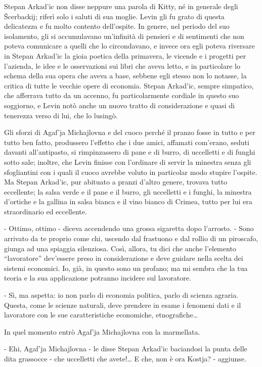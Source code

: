 Stepan Arkad'ic non disse neppure una parola di Kitty, né in generale degli Šcerbackij; riferì solo i saluti di sua moglie. Levin gli fu grato di questa delicatezza e fu molto contento dell'ospite. In genere, nel periodo del suo isolamento, gli si accumulavano un'infinità di pensieri e di sentimenti che non poteva comunicare a quelli che lo circondavano, e invece ora egli poteva riversare in Stepan Arkad'ic la gioia poetica della primavera, le vicende e i progetti per l'azienda, le idee e le osservazioni sui libri che aveva letto, e in particolare lo schema della sua opera che aveva a base, sebbene egli stesso non lo notasse, la critica di tutte le vecchie opere di economia. Stepan Arkad'ic, sempre simpatico, che afferrava tutto da un accenno, fu particolarmente cordiale in questo suo soggiorno, e Levin notò anche un nuovo tratto di considerazione e quasi di tenerezza verso di lui, che lo lusingò. 

Gli sforzi di Agaf'ja Michajlovna e del cuoco perché il pranzo fosse in tutto e per tutto ben fatto, produssero l'effetto che i due amici, affamati com'erano, seduti davanti all'antipasto, si rimpinzassero di pane e di burro, di uccelletti e di funghi sotto sale; inoltre, che Levin finisse con l'ordinare di servir la minestra senza gli sfogliantini con i quali il cuoco avrebbe voluto in particolar modo stupire l'ospite. Ma Stepan Arkad'ic, pur abituato a pranzi d'altro genere, trovava tutto eccellente; la salsa verde e il pane e il burro, gli uccelletti e i funghi, la minestra d'ortiche e la gallina in salsa bianca e il vino bianco di Crimea, tutto per lui era straordinario ed eccellente. 

- Ottimo, ottimo - diceva accendendo una grossa sigaretta dopo l'arrosto. - Sono arrivato da te proprio come chi, uscendo dal frastuono e dal rollio di un piroscafo, giunga ad una spiaggia silenziosa. Così, allora, tu dici che anche l'elemento ``lavoratore'' dev'essere preso in considerazione e deve guidare nella scelta dei sistemi economici. Io, già, in questo sono un profano; ma mi sembra che la tua teoria e la sua applicazione potranno incidere sul lavoratore. 

- Sì, ma aspetta: io non parlo di economia politica, parlo di scienza agraria. Questa, come le scienze naturali, deve prendere in esame i fenomeni dati e il lavoratore con le sue caratteristiche economiche, etnografiche\ldots{} 

In quel momento entrò Agaf'ja Michajlovna con la marmellata. 

- Ehi, Agaf'ja Michajlovna - le disse Stepan Arkad'ic baciandosi la punta delle dita grassocce - che uccelletti che avete!\ldots{} E che, non è ora Kostja? - aggiunse. 

